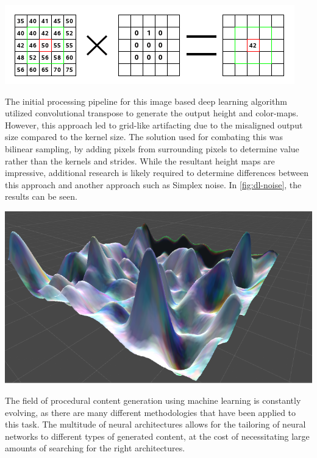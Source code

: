 \documentclass[10pt]{report}
\begin{document}
		\begin{minipage}{\textwidth}
			\centering
			\includegraphics[scale=1]{convolution-calculate}
			\label{fig:gimp}
		\end{minipage}
		
		The initial processing pipeline for this image based deep learning algorithm utilized convolutional transpose to generate the output height and color-maps. However, this approach led to grid-like artifacting due to the misaligned output size compared to the kernel size. The solution used for combating this was bilinear sampling, by adding pixels from surrounding pixels to determine value rather than the kernels and strides. While the resultant height maps are impressive, additional research is likely required to determine differences between this approach and another approach such as Simplex noise. In \autoref{fig:dl-noise}, the results can be seen. 
		
		\begin{minipage}{\textwidth}
			\centering
			\includegraphics[scale=.3]{rolling}
			\label{fig:dl-noise}
		\end{minipage}
	
		The field of procedural content generation using machine learning is constantly evolving, as there are many different methodologies that have been applied to this task. The multitude of neural architectures allows for the tailoring of neural networks to different types of generated content, at the cost of necessitating large amounts of searching for the right architectures.
		
\end{document}
